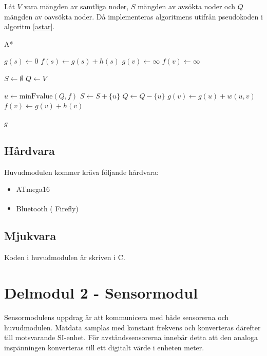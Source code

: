 \documentclass[11pt]{article}
\begin{document}
\begin{flushleft}
Låt $V$ vara mängden av samtliga noder, $S$ mängden av avsökta noder och $Q$ mängden av oavsökta noder. Då implementeras algoritmens utifrån pseudokoden i algoritm \ref{astar}.

\begin{algorithm}[H]
	\caption{A*} \label{astar}
	\begin{algorithmic}[1]
			\State $g(s) \gets 0$
			\State $f(s) \gets g(s) + h(s)$
				\State $g(v) \gets \infty$
				\State $f(v) \gets \infty$
			\EndFor
			
			\State $S \gets \emptyset$
			\State $Q \gets V$
			
				\State $u \gets \textrm{minFvalue}(Q,f)$%
				\State $S \gets S +  \{ u\}$
				\State $Q \gets Q - \{ u\}$
						\State $g(v) \gets g(u) + w(u,v)$
						\State $f(v) \gets g(v) + h(v)$
					\EndIf
				\EndFor
			\EndWhile
			
			\Return $g$
		\EndFunction
	\end{algorithmic}
\end{algorithm}
  

\subsection{Hårdvara}
Huvudmodulen kommer kräva följande hårdvara:
\begin{itemize}
	\item ATmega16
	\item  Bluetooth\textsuperscript{\circledR} ( Firefly)
\end{itemize}


\subsection{Mjukvara}
Koden i huvudmodulen är skriven i C. 

\pagebreak
\section{Delmodul 2 - Sensormodul}
Sensormodulens uppdrag är att kommunicera med både sensorerna och huvudmodulen. Mätdata samplas med konstant frekvens och konverteras därefter till motsvarande SI-enhet. För avståndssensorerna innebär detta att den analoga inspänningen konverteras till ett digitalt värde i enheten meter.


\end{flushleft}
\end{document}
